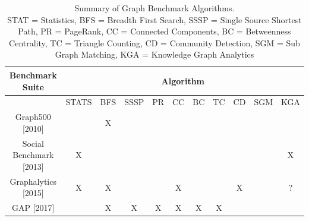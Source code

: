 \documentclass[letterpaper, 10pt]{article}
\begin{document}
\begin{multicols}{2}
{        \scriptsize
        \begin{table}[h]
        \centering
          \begin{tabular}{ |c|c|c|c|c|c|c|c|c|c|c|}
            \hline
            {Benchmark Suite} & \multicolumn{10}{|c|}{Algorithm}\\
            \hline
                                                      & STATS & BFS & SSSP & PR & CC & BC & TC & CD & SGM & KGA \\
            \hline
             Graph500 [2010]\cite{Murphy2010}         &       & X   &      &    &    &    &    &    &     &      \\
             Social Benchmark [2013]\cite{Angles2013} &   X   &     &      &    &    &    &    &    &     &  X   \\
             Graphalytics [2015]\cite{Capota2015}     &   X   & X   &      &    & X  &    &    &  X &     & ?    \\
             GAP [2017]\cite{Beamer2017}              &       & X   & X    & X  & X  & X  & X  &    &     &      \\
            \hline
          \end{tabular}
          \caption{Summary of Graph Benchmark Algorithms.\\ STAT = Statistics, BFS = Breadth First Search, SSSP = Single Source Shortest Path, PR = PageRank, CC = Connected Components, BC = Betweenness Centrality, TC = Triangle Counting, CD = Community Detection, SGM = Sub Graph Matching, KGA = Knowledge Graph Analytics}
          \label{table:graphAlgorithms}
        \end{table}

        \normalsize

}
\end{multicols}
\end{document}
